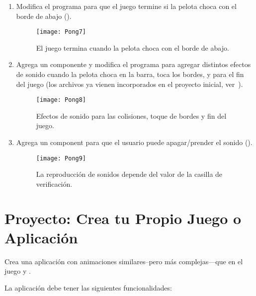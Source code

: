 \begin{enumerate}
\item Modifica el programa para que el juego termine si la pelota
  choca con el borde de abajo ().

\begin{figure}[H]
\centering
\texttt{[image: Pong7]}
\caption{El juego termina cuando la pelota choca con el borde de abajo.}
\label{fig:Pong7}
\end{figure}

\item Agrega un componente  y modifica el programa para agregar distintos efectos de sonido
  cuando la pelota choca en la barra, toca los bordes, y para el fin
  del juego (los archivos ya vienen incorporados en el proyecto
  inicial, ver~).

\begin{figure}[H]
\vspace{3em}
\centering
\texttt{[image: Pong8]}
\caption{Efectos de sonido para las colisiones, toque de bordes y fin
  del juego.}
\label{fig:Pong8}
\end{figure}

\item Agrega un component  para que
  el usuario puede apagar/prender el sonido ().

\begin{figure}[H]
\centering
\texttt{[image: Pong9]}
\caption{La reproducción de sonidos depende del valor de la casilla de
verificación.}
\label{fig:Pong9}
\end{figure}





\end{enumerate}

\section{Proyecto: Crea tu Propio Juego o Aplicación}

Crea una aplicación con animaciones similares--pero más
complejas---que en el juego  y .

La aplicación debe tener las siguientes funcionalidades:

